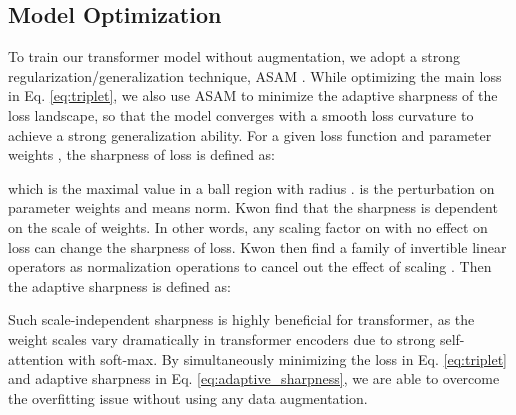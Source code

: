 \documentclass[10pt,twocolumn,letterpaper]{article}
\begin{document}
\subsection{Model Optimization}
\label{sec:asam}
To train our transformer model without augmentation, we adopt a strong regularization/generalization technique, ASAM \cite{ASAM}. While optimizing the main loss in Eq. \ref{eq:triplet}, we also use ASAM to minimize the adaptive sharpness of the loss landscape, so that the model converges with a smooth loss curvature to achieve a strong generalization ability. 
For a given loss function  and parameter weights , the sharpness of loss is defined as:

which is the maximal value in a  ball region with radius  .  is the perturbation on parameter weights  and  means  norm. Kwon \etal \cite{ASAM} find that the sharpness is dependent on the scale of weights. In other words, any scaling factor  on  with no effect on loss  can change the sharpness of loss. Kwon \etal then find a family of invertible linear operators  as normalization operations to  cancel out the effect of scaling . Then the adaptive sharpness is defined as:

Such scale-independent sharpness is highly beneficial for transformer, as the weight scales vary dramatically in transformer encoders due to strong self-attention with soft-max. By simultaneously minimizing the loss in Eq. \ref{eq:triplet} and adaptive sharpness in Eq. \ref{eq:adaptive_sharpness}, we are able to overcome the overfitting issue without using any data augmentation. 
\end{document}
